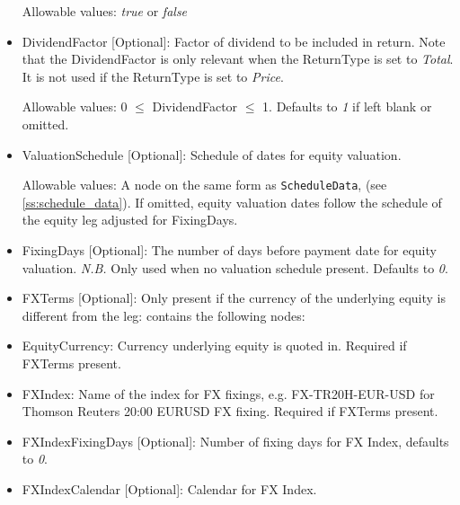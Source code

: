 \begin{itemize}
Allowable values:  \emph{true} or  \emph{false}

\item DividendFactor [Optional]: Factor of dividend to be included in return. Note that the DividendFactor is only relevant when the ReturnType is set to  \emph{Total}. It is not used if the ReturnType is set to \emph{Price}.

Allowable values: 0 $\leq$ DividendFactor $\leq$  1.   Defaults to \emph{1} if left blank or omitted.

\item ValuationSchedule [Optional]: Schedule of dates for equity valuation.

Allowable values: A node on the same form as \lstinline!ScheduleData!, (see \ref{ss:schedule_data}). If omitted, equity valuation dates follow the schedule of the equity leg adjusted for FixingDays.

\item FixingDays [Optional]: The number of days before payment date for equity valuation. \emph{N.B.} Only used when no valuation schedule present. Defaults to \emph{0}.

\item FXTerms [Optional]: Only present if the currency of the underlying equity is different from the leg: contains the following nodes:

\item EquityCurrency: Currency underlying equity is quoted in. Required if FXTerms present.

\item FXIndex: Name of the index for FX fixings, e.g. FX-TR20H-EUR-USD for Thomson Reuters 20:00 EURUSD FX fixing. Required if FXTerms present.

\item FXIndexFixingDays [Optional]: Number of fixing days for FX Index, defaults to \emph{0}.

\item FXIndexCalendar [Optional]: Calendar for FX Index.

\end{itemize} 

